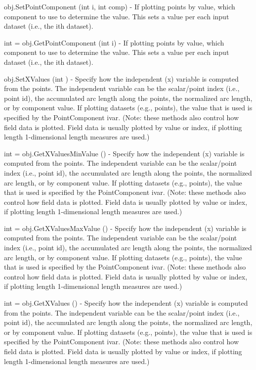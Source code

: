\begin{DoxyItemize}
\item {\ttfamily obj.\-Set\-Point\-Component (int i, int comp)} -\/ If plotting points by value, which component to use to determine the value. This sets a value per each input dataset (i.\-e., the ith dataset).  
\item {\ttfamily int = obj.\-Get\-Point\-Component (int i)} -\/ If plotting points by value, which component to use to determine the value. This sets a value per each input dataset (i.\-e., the ith dataset).  
\item {\ttfamily obj.\-Set\-X\-Values (int )} -\/ Specify how the independent (x) variable is computed from the points. The independent variable can be the scalar/point index (i.\-e., point id), the accumulated arc length along the points, the normalized arc length, or by component value. If plotting datasets (e.\-g., points), the value that is used is specified by the Point\-Component ivar. (Note\-: these methods also control how field data is plotted. Field data is usually plotted by value or index, if plotting length 1-\/dimensional length measures are used.)  
\item {\ttfamily int = obj.\-Get\-X\-Values\-Min\-Value ()} -\/ Specify how the independent (x) variable is computed from the points. The independent variable can be the scalar/point index (i.\-e., point id), the accumulated arc length along the points, the normalized arc length, or by component value. If plotting datasets (e.\-g., points), the value that is used is specified by the Point\-Component ivar. (Note\-: these methods also control how field data is plotted. Field data is usually plotted by value or index, if plotting length 1-\/dimensional length measures are used.)  
\item {\ttfamily int = obj.\-Get\-X\-Values\-Max\-Value ()} -\/ Specify how the independent (x) variable is computed from the points. The independent variable can be the scalar/point index (i.\-e., point id), the accumulated arc length along the points, the normalized arc length, or by component value. If plotting datasets (e.\-g., points), the value that is used is specified by the Point\-Component ivar. (Note\-: these methods also control how field data is plotted. Field data is usually plotted by value or index, if plotting length 1-\/dimensional length measures are used.)  
\item {\ttfamily int = obj.\-Get\-X\-Values ()} -\/ Specify how the independent (x) variable is computed from the points. The independent variable can be the scalar/point index (i.\-e., point id), the accumulated arc length along the points, the normalized arc length, or by component value. If plotting datasets (e.\-g., points), the value that is used is specified by the Point\-Component ivar. (Note\-: these methods also control how field data is plotted. Field data is usually plotted by value or index, if plotting length 1-\/dimensional length measures are used.)  

\end{DoxyItemize}
